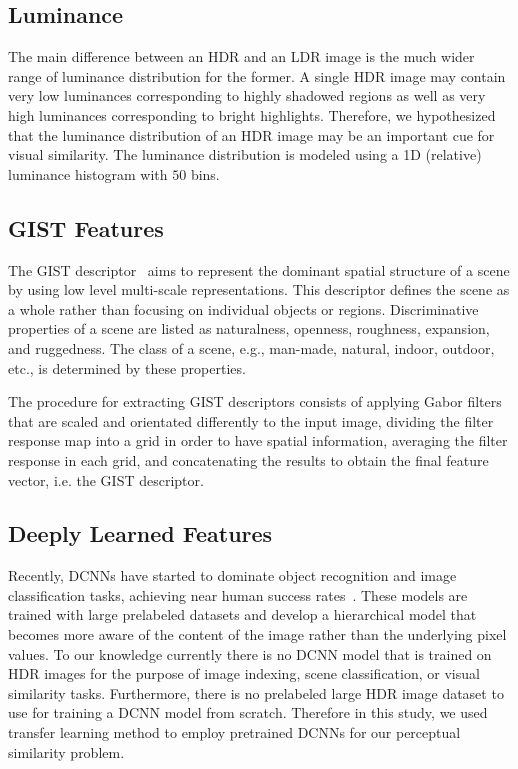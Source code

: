 \subsection{Luminance}
The main difference between an HDR and an LDR image is the much wider range of luminance distribution for the former. A single HDR image may contain very low luminances corresponding to highly shadowed regions as well as very high luminances corresponding to bright highlights. Therefore, we hypothesized that the luminance distribution of an HDR image may be an important cue for visual similarity. The luminance distribution is modeled using a 1D (relative) luminance histogram with $50$ bins.
\subsection{GIST Features}
The GIST descriptor~\cite{oliva2001modeling} aims to represent the dominant spatial structure of a scene by using low level multi-scale representations. This descriptor defines the scene as a whole rather than focusing on individual objects or regions. Discriminative properties of a scene are listed as naturalness, openness, roughness, expansion, and ruggedness. The class of a scene, e.g., man-made, natural, indoor, outdoor, etc., is determined by these properties.

The procedure for extracting GIST descriptors consists of applying Gabor filters that are scaled and orientated differently to the input image, dividing the filter response map into a grid in order to have spatial information, averaging the filter response in each grid, and concatenating the results to obtain the final feature vector, i.e. the GIST descriptor.

\subsection{Deeply Learned Features}
Recently, DCNNs have started to dominate object recognition and image classification tasks, achieving near human success rates~\cite{krizhevsky2012imagenet,simonyan2014very,zhou2017scene}. These models are trained with large prelabeled datasets and develop a hierarchical model that becomes more aware of the content of the image rather than the underlying pixel values. To our knowledge currently there is no DCNN model that is trained on HDR images for the purpose of image indexing, scene classification, or visual similarity tasks.
Furthermore, there is no prelabeled large HDR image dataset to use for training a DCNN model from scratch. Therefore in this study, we used transfer learning method to employ pretrained DCNNs for our perceptual similarity problem. 

